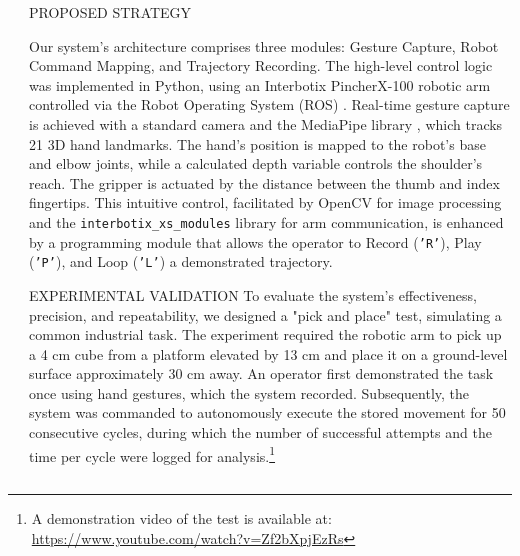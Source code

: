 \documentclass[%
  final,%
  english,%
  english,%
]{beamer}
\begin{document}
\begin{frame}[t, fragile = singleslide]
\begin{columns}[t, onlytextwidth]
\begin{column}{0.49\textwidth}
%
\end{column}
%
\begin{column}{0.49\textwidth}
%
\begin{block}{PROPOSED STRATEGY}

Our system's architecture comprises three modules: Gesture Capture, Robot Command Mapping, and Trajectory Recording. The high-level control logic was implemented in Python, using an Interbotix PincherX-100 robotic arm controlled via the Robot Operating System (ROS) \cite{ros}. Real-time gesture capture is achieved with a standard camera and the MediaPipe library \cite{mediapipe}, which tracks 21 3D hand landmarks. The hand's position is mapped to the robot's base and elbow joints, while a calculated depth variable controls the shoulder's reach. The gripper is actuated by the distance between the thumb and index fingertips. This intuitive control, facilitated by OpenCV \cite{opencv_library} for image processing and the \texttt{interbotix\_xs\_modules} library for arm communication, is enhanced by a programming module that allows the operator to Record (\texttt{'R'}), Play (\texttt{'P'}), and Loop (\texttt{'L'}) a demonstrated trajectory.



\end{block}
%
\begin{block}{EXPERIMENTAL VALIDATION}
To evaluate the system's effectiveness, precision, and repeatability, we designed a "pick and place" test, simulating a common industrial task. The experiment required the robotic arm to pick up a 4 cm cube from a platform elevated by 13 cm and place it on a ground-level surface approximately 30 cm away. An operator first demonstrated the task once using hand gestures, which the system recorded. Subsequently, the system was commanded to autonomously execute the stored movement for 50 consecutive cycles, during which the number of successful attempts and the time per cycle were logged for analysis.\footnote{A demonstration video of the test is available at: \url{https://www.youtube.com/watch?v=Zf2bXpjEzRs}}


\end{block}
\end{column}
\end{columns}
\end{frame}
\end{document}
